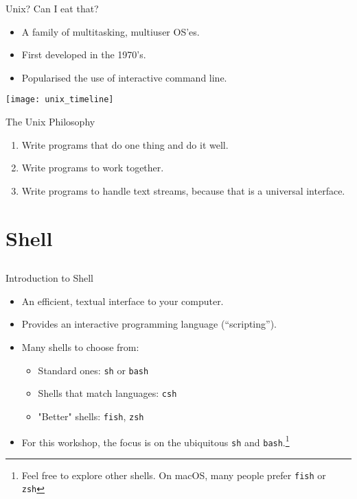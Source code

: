 \documentclass[12pt]{beamer}
\begin{document}
\begin{frame}{Unix? Can I eat that?}
  \begin{itemize}
    \item A family of multitasking, multiuser OS'es.
    \item First developed in the 1970's.
    \item Popularised the use of interactive command line.
  \end{itemize}
  \begin{center}
    \texttt{[image: unix\_timeline]}
  \end{center}
\end{frame}

\begin{frame}{The Unix Philosophy}
  \begin{enumerate}
    \item Write programs that do one thing and do it well.
    \item Write programs to work together.
    \item Write programs to handle text streams, because that is a universal interface.
  \end{enumerate}
\end{frame}

\section{Shell}
\subsection{}
\begin{frame}{Introduction to Shell}
  \begin{itemize}
    \item An efficient, textual interface to your computer.
    \item Provides an interactive programming language (``scripting'').
    \item Many shells to choose from:
          \begin{itemize}
            \item Standard ones: \texttt{sh} or \texttt{bash}
            \item Shells that match languages: \texttt{csh}
            \item "Better" shells: \texttt{fish}, \texttt{zsh}
          \end{itemize}
    \item For this workshop, the focus is on the ubiquitous \texttt{sh} and \texttt{bash}.\footnote{Feel free to explore other shells. On macOS, many people prefer \texttt{fish} or \texttt{zsh}}
  \end{itemize}
\end{frame}
\end{document}
